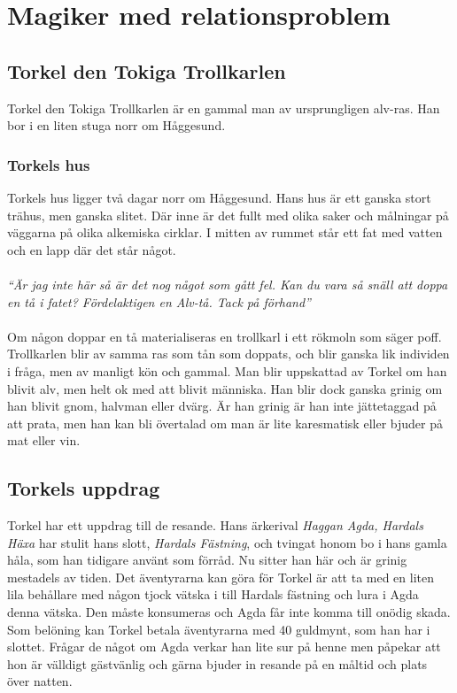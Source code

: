 \chapter*{Magiker med relationsproblem}
%
\section*{Torkel den Tokiga Trollkarlen}
Torkel den Tokiga Trollkarlen är en gammal man av ursprungligen alv-ras. Han bor i en liten stuga norr om Håggesund.
%
\subsection*{Torkels hus}
Torkels hus ligger två dagar norr om Håggesund. Hans hus är ett ganska stort trähus, men ganska slitet. Där inne är det fullt med olika saker och målningar på väggarna på olika alkemiska cirklar.
I mitten av rummet står ett fat med vatten och en lapp där det står något. \\ \\
%
\textit{``Är jag inte här så är det nog något som gått fel. Kan du vara så snäll att doppa en tå i fatet? Fördelaktigen en Alv-tå. Tack på förhand''} \\ \\
%
Om någon doppar en tå materialiseras en trollkarl i ett rökmoln som säger poff. Trollkarlen blir av samma ras som tån som doppats, och blir ganska lik individen i fråga, men av manligt kön och gammal. Man blir uppskattad av Torkel om han blivit alv, men helt ok med att blivit människa. Han blir dock ganska grinig om han blivit gnom, halvman eller dvärg. Är han grinig är han inte jättetaggad på att prata, men han kan bli övertalad om man är lite karesmatisk eller bjuder på mat eller vin.
%
\section*{Torkels uppdrag}
Torkel har ett uppdrag till de resande. Hans ärkerival \textit{Haggan Agda, Hardals Häxa} har stulit hans slott, \textit{Hardals Fästning}, och tvingat honom bo i hans gamla håla, som han tidigare använt som förråd. Nu sitter han här och är grinig mestadels av tiden. Det äventyrarna kan göra för Torkel är att ta med en liten lila behållare med någon tjock vätska i till Hardals fästning och lura i Agda denna vätska. Den måste konsumeras och Agda får inte komma till onödig skada. Som belöning kan Torkel betala äventyrarna med 40 guldmynt, som han har i slottet. Frågar de något om Agda verkar han lite sur på henne men påpekar att hon är välldigt gästvänlig och gärna bjuder in resande på en måltid och plats över natten.
%
